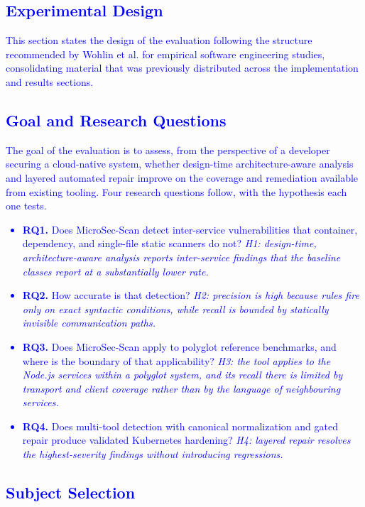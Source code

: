 \documentclass[preprint,12pt]{elsarticle}
\newcommand{\new}[1]{\textcolor{blue}{#1}}
\begin{document}
\new{\section{Experimental Design}}
\label{sec:expdesign}

\new{This section states the design of the evaluation following the
structure recommended by Wohlin et al. for empirical software engineering
studies, consolidating material that was previously distributed across the
implementation and results sections.}

\new{\subsection{Goal and Research Questions}}

\new{The goal of the evaluation is to assess, from the perspective of a
developer securing a cloud-native system, whether design-time
architecture-aware analysis and layered automated repair improve on the
coverage and remediation available from existing tooling. Four research
questions follow, with the hypothesis each one tests.}

\new{
\begin{itemize}
\item \textbf{RQ1.} Does MicroSec-Scan detect inter-service vulnerabilities
that container, dependency, and single-file static scanners do not?
\emph{H1: design-time, architecture-aware analysis reports inter-service
findings that the baseline classes report at a substantially lower rate.}
\item \textbf{RQ2.} How accurate is that detection? \emph{H2: precision is
high because rules fire only on exact syntactic conditions, while recall is
bounded by statically invisible communication paths.}
\item \textbf{RQ3.} Does MicroSec-Scan apply to polyglot reference
benchmarks, and where is the boundary of that applicability?
\emph{H3: the tool applies to the Node.js services within a polyglot system,
and its recall there is limited by transport and client coverage rather than
by the language of neighbouring services.}
\item \textbf{RQ4.} Does multi-tool detection with canonical normalization
and gated repair produce validated Kubernetes hardening? \emph{H4: layered
repair resolves the highest-severity findings without introducing
regressions.}
\end{itemize}
}

\new{\subsection{Subject Selection}}
\end{document}
